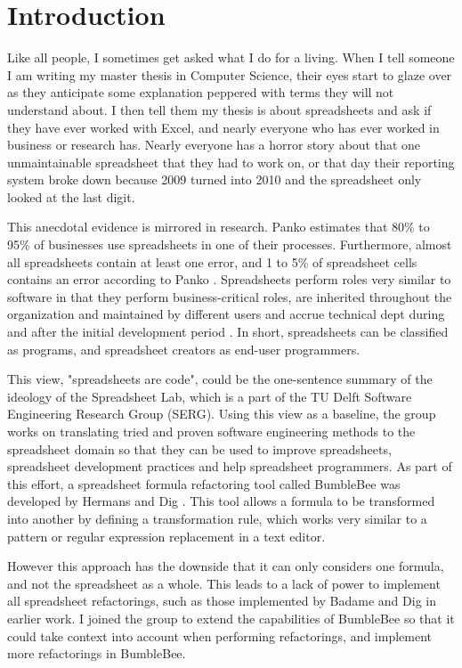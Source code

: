 \chapter{Introduction}
\label{chapter:introduction}

Like all people, I sometimes get asked what I do for a living.
When I tell someone I am writing my master thesis in Computer Science, their eyes start to glaze over as they anticipate some explanation peppered with terms they will not understand about.
I then tell them my thesis is about spreadsheets and ask if they have ever worked with Excel, and nearly everyone who has ever worked in business or research has.
Nearly everyone has a horror story about that one unmaintainable spreadsheet that they had to work on, or that day their reporting system broke down because 2009 turned into 2010 and the spreadsheet only looked at the last digit.

This anecdotal evidence is mirrored in research.
Panko \cite{panko2006facing} estimates that 80\% to 95\% of businesses use spreadsheets in one of their processes.
Furthermore, almost all spreadsheets contain at least one error, and 1 to 5\% of spreadsheet cells contains an error according to Panko \cite{panko1998we}.
Spreadsheets perform roles very similar to software in that they perform business-critical roles, are inherited throughout the organization and maintained by different users and accrue technical dept during and after the initial development period \cite{panko1998we}.
In short, spreadsheets can be classified as programs, and spreadsheet creators as end-user programmers.

This view, "spreadsheets are code", could be the one-sentence summary of the ideology of the Spreadsheet Lab, which is a part of the TU Delft Software Engineering Research Group (SERG).
Using this view as a baseline, the group works on translating tried and proven software engineering methods to the spreadsheet domain so that they can be used to improve spreadsheets, spreadsheet development practices and help spreadsheet programmers.
As part of this effort, a spreadsheet formula refactoring tool called BumbleBee was developed by Hermans and Dig \cite{hermans2014bumblebee}.
This tool allows a formula to be transformed into another by defining a transformation rule, which works very similar to a pattern or regular expression replacement in a text editor.

However this approach has the downside that it can only considers one formula, and not the spreadsheet as a whole.
This leads to a lack of power to implement all spreadsheet refactorings, such as those implemented by Badame and Dig \cite{badame2012refactoring} in earlier work.
I joined the group to extend the capabilities of BumbleBee so that it could take context into account when performing refactorings, and implement more refactorings in BumbleBee.


